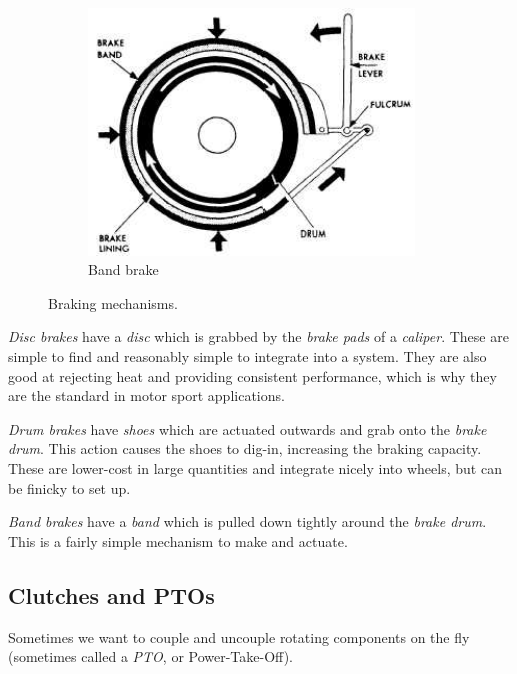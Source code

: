 \documentclass[10pt,letterpaper]{book}
\begin{document}
\begin{figure}[H]
\begin{subfigure}[b]{.32\linewidth}
		\includegraphics[width=0.95\textwidth]{imgs/brake_band.jpeg}
		\caption{Band brake}
	\end{subfigure}
	\caption{Braking mechanisms.}
\end{figure}

\begin{asparaenum}[a)]
	\item \textit{Disc brakes} have a \textit{disc} which is grabbed by the \textit{brake pads} of a \textit{caliper}. These are simple to find and reasonably simple to integrate into a system. They are also good at rejecting heat and providing consistent performance, which is why they are the standard in motor sport applications.
	\item \textit{Drum brakes} have \textit{shoes} which are actuated outwards and grab onto the \textit{brake drum}. This action causes the shoes to dig-in, increasing the braking capacity. These are lower-cost in large quantities and integrate nicely into wheels, but can be finicky to set up.
	\item \textit{Band brakes} have a \textit{band} which is pulled down tightly around the \textit{brake drum}. This is a fairly simple mechanism to make and actuate. 
\end{asparaenum}


\subsection{Clutches and PTOs}

Sometimes we want to couple and uncouple rotating components on the fly (sometimes called a \textit{PTO}, or Power-Take-Off).
\end{document}
